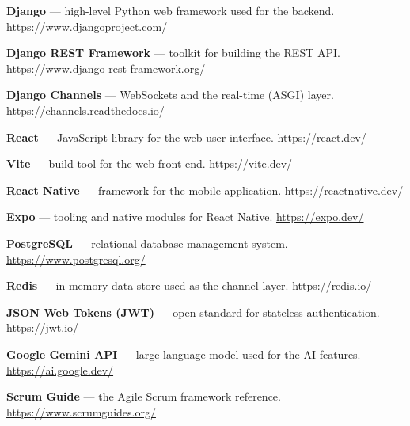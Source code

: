 \documentclass[12pt,a4paper,oneside]{report}
\begin{document}
\begin{enumerate}[label={[\arabic*]}]
  \item \textbf{Django} --- high-level Python web framework used for the backend.
        \url{https://www.djangoproject.com/}
  \item \textbf{Django REST Framework} --- toolkit for building the REST API.
        \url{https://www.django-rest-framework.org/}
  \item \textbf{Django Channels} --- WebSockets and the real-time (ASGI) layer.
        \url{https://channels.readthedocs.io/}
  \item \textbf{React} --- JavaScript library for the web user interface.
        \url{https://react.dev/}
  \item \textbf{Vite} --- build tool for the web front-end.
        \url{https://vite.dev/}
  \item \textbf{React Native} --- framework for the mobile application.
        \url{https://reactnative.dev/}
  \item \textbf{Expo} --- tooling and native modules for React Native.
        \url{https://expo.dev/}
  \item \textbf{PostgreSQL} --- relational database management system.
        \url{https://www.postgresql.org/}
  \item \textbf{Redis} --- in-memory data store used as the channel layer.
        \url{https://redis.io/}
  \item \textbf{JSON Web Tokens (JWT)} --- open standard for stateless
        authentication. \url{https://jwt.io/}
  \item \textbf{Google Gemini API} --- large language model used for the AI
        features. \url{https://ai.google.dev/}
  \item \textbf{Scrum Guide} --- the Agile Scrum framework reference.
        \url{https://www.scrumguides.org/}
\end{enumerate}
\end{document}
